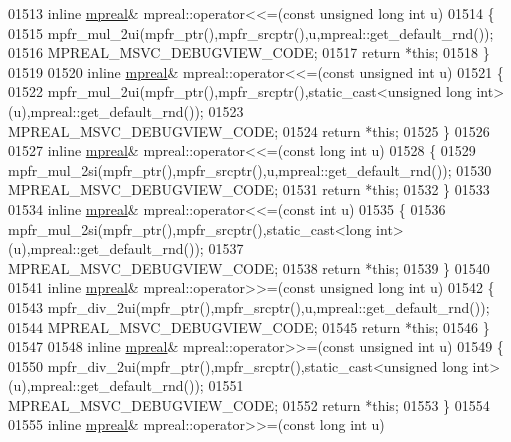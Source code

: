 \begin{DoxyCode}
01513 \textcolor{keyword}{inline} \hyperlink{classmpfr_1_1mpreal}{mpreal}& mpreal::operator<<=(\textcolor{keyword}{const} \textcolor{keywordtype}{unsigned} \textcolor{keywordtype}{long} \textcolor{keywordtype}{int} u)
01514 \{
01515     mpfr\_mul\_2ui(mpfr\_ptr(),mpfr\_srcptr(),u,mpreal::get\_default\_rnd());
01516     MPREAL\_MSVC\_DEBUGVIEW\_CODE;
01517     \textcolor{keywordflow}{return} *\textcolor{keyword}{this};
01518 \}
01519 
01520 \textcolor{keyword}{inline} \hyperlink{classmpfr_1_1mpreal}{mpreal}& mpreal::operator<<=(\textcolor{keyword}{const} \textcolor{keywordtype}{unsigned} \textcolor{keywordtype}{int} u)
01521 \{
01522     mpfr\_mul\_2ui(mpfr\_ptr(),mpfr\_srcptr(),static\_cast<unsigned long int>(u),mpreal::get\_default\_rnd());
01523     MPREAL\_MSVC\_DEBUGVIEW\_CODE;
01524     \textcolor{keywordflow}{return} *\textcolor{keyword}{this};
01525 \}
01526 
01527 \textcolor{keyword}{inline} \hyperlink{classmpfr_1_1mpreal}{mpreal}& mpreal::operator<<=(\textcolor{keyword}{const} \textcolor{keywordtype}{long} \textcolor{keywordtype}{int} u)
01528 \{
01529     mpfr\_mul\_2si(mpfr\_ptr(),mpfr\_srcptr(),u,mpreal::get\_default\_rnd());
01530     MPREAL\_MSVC\_DEBUGVIEW\_CODE;
01531     \textcolor{keywordflow}{return} *\textcolor{keyword}{this};
01532 \}
01533 
01534 \textcolor{keyword}{inline} \hyperlink{classmpfr_1_1mpreal}{mpreal}& mpreal::operator<<=(\textcolor{keyword}{const} \textcolor{keywordtype}{int} u)
01535 \{
01536     mpfr\_mul\_2si(mpfr\_ptr(),mpfr\_srcptr(),static\_cast<long int>(u),mpreal::get\_default\_rnd());
01537     MPREAL\_MSVC\_DEBUGVIEW\_CODE;
01538     \textcolor{keywordflow}{return} *\textcolor{keyword}{this};
01539 \}
01540 
01541 \textcolor{keyword}{inline} \hyperlink{classmpfr_1_1mpreal}{mpreal}& mpreal::operator>>=(\textcolor{keyword}{const} \textcolor{keywordtype}{unsigned} \textcolor{keywordtype}{long} \textcolor{keywordtype}{int} u)
01542 \{
01543     mpfr\_div\_2ui(mpfr\_ptr(),mpfr\_srcptr(),u,mpreal::get\_default\_rnd());
01544     MPREAL\_MSVC\_DEBUGVIEW\_CODE;
01545     \textcolor{keywordflow}{return} *\textcolor{keyword}{this};
01546 \}
01547 
01548 \textcolor{keyword}{inline} \hyperlink{classmpfr_1_1mpreal}{mpreal}& mpreal::operator>>=(\textcolor{keyword}{const} \textcolor{keywordtype}{unsigned} \textcolor{keywordtype}{int} u)
01549 \{
01550     mpfr\_div\_2ui(mpfr\_ptr(),mpfr\_srcptr(),static\_cast<unsigned long int>(u),mpreal::get\_default\_rnd());
01551     MPREAL\_MSVC\_DEBUGVIEW\_CODE;
01552     \textcolor{keywordflow}{return} *\textcolor{keyword}{this};
01553 \}
01554 
01555 \textcolor{keyword}{inline} \hyperlink{classmpfr_1_1mpreal}{mpreal}& mpreal::operator>>=(\textcolor{keyword}{const} \textcolor{keywordtype}{long} \textcolor{keywordtype}{int} u)

\end{DoxyCode}
